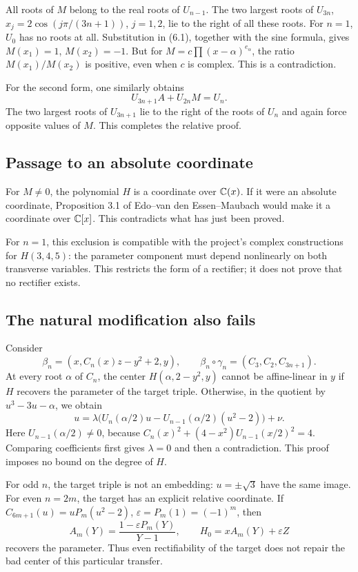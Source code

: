 All roots of $M$ belong to the real roots of $U_{n-1}$. The two largest roots of $U_{3n}$,
$x_j=2\cos(j\pi/(3n+1))$, $j=1,2$, lie to the right of all these roots. For $n=1$, $U_0$ has no roots at all. Substitution in (6.1), together with the sine formula, gives
$M(x_1)=1$, $M(x_2)=-1$.
But for $M=c\prod(x-\alpha)^{e_\alpha}$, the ratio $M(x_1)/M(x_2)$ is positive, even when $c$ is complex. This is a contradiction.

For the second form, one similarly obtains
\[
U_{3n+1}A+U_{2n}M=U_n.
\]
The two largest roots of $U_{3n+1}$ lie to the right of the roots of $U_n$ and again force opposite values of $M$. This completes the relative proof.

\subsection*{Passage to an absolute coordinate}
For $M\ne0$, the polynomial $H$ is a coordinate over ${\mathbb{C}}(x)$. If it were an absolute coordinate, Proposition 3.1 of Edo--van den Essen--Maubach \cite{EVM} would make it a coordinate over ${\mathbb{C}}[x]$. This contradicts what has just been proved.

For $n=1$, this exclusion is compatible with the project's complex constructions for $H(3,4,5)$: the parameter component must depend nonlinearly on both transverse variables. This restricts the form of a rectifier; it does not prove that no rectifier exists.

\subsection*{The natural modification also fails}
Consider
\[
\beta_n=(x,C_n(x)z-y^2+2,y),\qquad
\beta_n\circ\gamma_n=(C_3,C_2,C_{3n+1}).
\]
At every root $\alpha$ of $C_n$, the center $H(\alpha,2-y^2,y)$ cannot be affine-linear in $y$ if $H$ recovers the parameter of the target triple. Otherwise, in the quotient by $u^3-3u-\alpha$, we obtain
\[
u=\lambda\bigl(U_n(\alpha/2)u-U_{n-1}(\alpha/2)(u^2-2)\bigr)+\nu.
\]
Here $U_{n-1}(\alpha/2)\ne0$, because
$C_n(x)^2+(4-x^2)U_{n-1}(x/2)^2=4$. Comparing coefficients first gives $\lambda=0$ and then a contradiction. This proof imposes no bound on the degree of $H$.

For odd $n$, the target triple is not an embedding: $u=\pm\sqrt3$ have the same image. For even $n=2m$, the target has an explicit relative coordinate. If
$C_{6m+1}(u)=uP_m(u^2-2)$, $\varepsilon=P_m(1)=(-1)^m$, then
\[
A_m(Y)=\frac{1-\varepsilon P_m(Y)}{Y-1},\qquad
H_0=xA_m(Y)+\varepsilon Z
\]
recovers the parameter. Thus even rectifiability of the target does not repair the bad center of this particular transfer.

